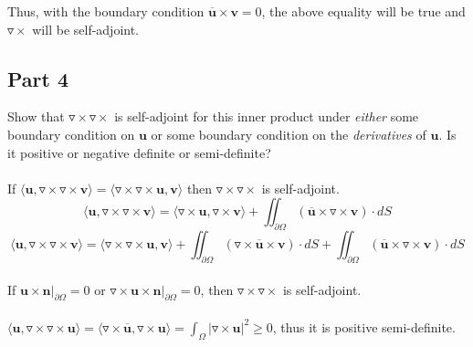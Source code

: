 \documentclass{amsart}
\begin{document}
	\noindent
	Thus, with the boundary condition $\overline{\mathbf{u}} \times \mathbf{v} = 0$, the above equality will be true and $\triangledown\times$ will be self-adjoint.
	\\
	\subsection{Part 4}
	Show that $\triangledown\times\triangledown\times$ is self-adjoint for this inner product under \textit{either} some boundary condition on $\mathbf{u}$ or some boundary condition on the \textit{derivatives} of $\mathbf{u}$. Is it positive or negative definite or semi-definite?
	\\\\
	If $\langle \mathbf{u},\triangledown\times\triangledown\times\mathbf{v}\rangle = \langle \triangledown\times\triangledown\times\mathbf{u},\mathbf{v}\rangle$ then $\triangledown\times\triangledown\times$ is self-adjoint.
	\\
	\[
	\langle \mathbf{u},\triangledown\times\triangledown\times \mathbf{v}\rangle = \langle \triangledown\times\mathbf{u},\triangledown\times\mathbf{v}\rangle + \iint_{\partial\Omega} (\overline{\mathbf{u}} \times \triangledown\times \mathbf{v}) \cdot dS
	\]
	\[
	\langle\mathbf{u},\triangledown\times\triangledown\times \mathbf{v}\rangle = \langle \triangledown\times\triangledown\times\mathbf{u}, \mathbf{v}\rangle + \iint_{\partial\Omega}(\triangledown\times\overline{\mathbf{u}}\times\mathbf{v})\cdot dS + \iint_{\partial\Omega} (\overline{\mathbf{u}} \times \triangledown\times \mathbf{v}) \cdot dS
	\]\\
	If $\mathbf{u}\times \mathbf{n}|_{\partial\Omega} = 0$ or $\triangledown\times\mathbf{u}\times\mathbf{n}|_{\partial\Omega}=0$, then $\triangledown\times\triangledown\times$ is self-adjoint.
	\\\\
	$\langle\mathbf{u},\triangledown\times\triangledown\times\mathbf{u}\rangle = \langle\triangledown\times\mathbf{\overline{u}},\triangledown\times\mathbf{u}\rangle = \int_{\Omega}|\triangledown\times\mathbf{u}|^2 \geq 0$, thus it is positive semi-definite.
\end{document}
